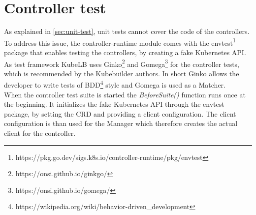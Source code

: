 \section{Controller test}\label{sec:controller-test}

As explained in \autoref{sec:unit-test}, unit tests cannot cover the code of the controllers.
To address this issue, the controller-runtime module comes with the envtest\footnote{https://pkg.go.dev/sigs.k8s.io/controller-runtime/pkg/envtest} package that enables testing the controllers, by creating a fake Kubernetes API.
As test framework KubeLB uses Ginko\footnote{https://onsi.github.io/ginkgo/} and Gomega\footnote{https://onsi.github.io/gomega/} for the controller tests, which is recommended by the Kubebuilder authors.
In short Ginko allows the developer to write tests of BDD\footnote{https://wikipedia.org/wiki/behavior-driven\_development} style and Gomega is used as a Matcher.
\\
When the controller test suite is started the \textit{BeforeSuite()} function runs once at the beginning.
It initializes the fake Kubernetes API through the envtest package, by setting the CRD and providing a client configuration.
The client configuration is than used for the Manager which therefore creates the actual client for the controller.
